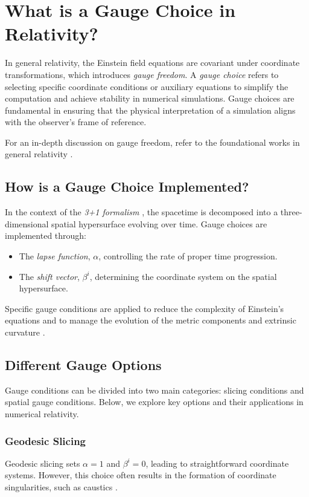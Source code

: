 \documentclass[12pt]{article}
\begin{document}
\section{What is a Gauge Choice in Relativity?}
In general relativity, the Einstein field equations are covariant under coordinate transformations, which introduces \textit{gauge freedom}. A \textit{gauge choice} refers to selecting specific coordinate conditions or auxiliary equations to simplify the computation and achieve stability in numerical simulations. Gauge choices are fundamental in ensuring that the physical interpretation of a simulation aligns with the observer's frame of reference.

For an in-depth discussion on gauge freedom, refer to the foundational works in general relativity \cite{wald1984general,gourgoulhon2012three}.

\subsection{How is a Gauge Choice Implemented?}
In the context of the \textit{3+1 formalism} \cite{gourgoulhon2012three,alcubierre2008introduction}, the spacetime is decomposed into a three-dimensional spatial hypersurface evolving over time. Gauge choices are implemented through:
\begin{itemize}
    \item The \textit{lapse function}, $\alpha$, controlling the rate of proper time progression.
    \item The \textit{shift vector}, $\beta^i$, determining the coordinate system on the spatial hypersurface.
\end{itemize}

Specific gauge conditions are applied to reduce the complexity of Einstein's equations and to manage the evolution of the metric components and extrinsic curvature \cite{baumgarte2010numerical,alcubierre2008introduction}. 

\subsection{Different Gauge Options}
Gauge conditions can be divided into two main categories: slicing conditions and spatial gauge conditions. Below, we explore key options and their applications in numerical relativity.

\subsubsection{Geodesic Slicing}
Geodesic slicing sets $\alpha = 1$ and $\beta^i = 0$, leading to straightforward coordinate systems. However, this choice often results in the formation of coordinate singularities, such as caustics \cite{smarr1978kinematical}.
\end{document}
